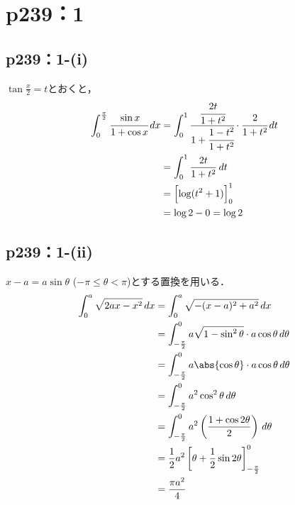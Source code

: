 \documentclass[a4paper,10pt,fleqn]{ltjsarticle}
\begin{document}
            \section*{p239：1}

\subsection*{p239：1-(i)}

\begin{screen}
	 $\tan \frac{x}{2}=t$とおくと，
	\begin{align*}
		\int_{0}^{\frac{\pi}{2}} \cfrac{\sin x}{1+\cos x} \, dx & = \int_{0}^{1} \cfrac{\cfrac{2t}{1+t^2}}{1+\cfrac{1-t^2}{1+t^2}} \cdot \cfrac{2}{1+t^2} \, dt \\
		& = \int_{0}^{1} \frac{2t}{1+t^2} \, dt \\
		& = \Bigl[\log (t^2+1)\Bigl]_{0}^{1} \\
		& = \log 2-0 = \log 2
	\end{align*}
\end{screen}


\subsection*{p239：1-(ii)}

\begin{screen}
	  $x-a=a \sin \theta$ ($-\pi \le \theta < \pi$)とする置換を用いる．
	\begin{align*}
		\int_{0}^{a} \sqrt{2ax-x^2} \, dx & = \int_{0}^{a} \sqrt{-(x-a)^2+a^2} \, dx \\
		& = \int_{-\frac{\pi}{2}}^{0} a \sqrt{1-\sin ^2 \theta } \cdot a\cos \theta \, d \theta \\
		& = \int_{-\frac{\pi}{2}}^{0} a \abs{\cos \theta} \cdot a\cos \theta \, d \theta \\
		& = \int_{-\frac{\pi}{2}}^{0} a^2 \cos^2 \theta \, d \theta \\
		& = \int_{-\frac{\pi}{2}}^{0} a^2 \left (\frac{1+\cos 2 \theta }{2}\right) \, d \theta \\
		& = \frac{1}{2} a^2 \left [\theta + \frac{1}{2}\sin 2 \theta \right ]_{-\frac{\pi}{2}}^{0} \\
		&= \frac{\pi a^2}{4}
	\end{align*}
\end{screen}
\end{document}
